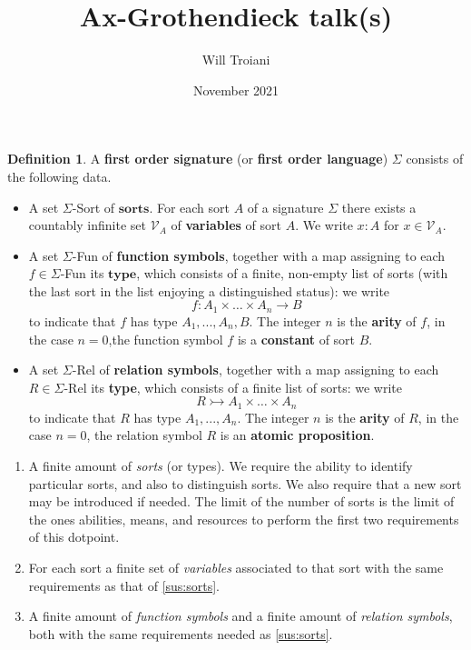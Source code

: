 \documentclass[12pt]{article}
\title{Ax-Grothendieck talk(s)}
\author{Will Troiani}
\date{November 2021}
\theoremstyle{plain}
\theoremstyle{definition}
\newtheorem{defn}[thm]{Definition} %
\newcommand{\call}[1]{\mathcal{#1}}
\newcommand{\lto}{\longrightarrow}
\begin{document}
\maketitle




\begin{defn}\label{def:first_order_language}
	A \textbf{first order signature} (or \textbf{first order language}) $\Sigma$ consists of the following data.
	\begin{itemize}
		\item A set $\Sigma$-Sort of $\textbf{sorts}$. For each sort $A$ of a signature $\Sigma$ there exists a countably infinite set $\call{V}_A$ of \textbf{variables} of sort $A$. We write $x:A$ for $x \in \call{V}_A$. 
		\item A set $\Sigma$-Fun of \textbf{function symbols}, together with a map assigning to each $f \in \Sigma$-Fun its $\textbf{type}$, which consists of a finite, non-empty list of sorts (with the last sort in the list enjoying a distinguished status): we write
		\begin{equation}
			f: A_1 \times \hdots\times A_n \lto B
		\end{equation}
		to indicate that $f$ has type $A_1,...,A_n,B$. The integer $n$ is the \textbf{arity} of $f$, in the case $n = 0$,the function symbol $f$ is a \textbf{constant} of sort $B$.
		\item A set $\Sigma$-Rel of \textbf{relation symbols}, together with a map assigning to each $R \in \Sigma$-Rel its \textbf{type}, which consists of a finite list of sorts: we write
		\begin{equation}
			R \rightarrowtail A_1 \times \hdots \times A_n
		\end{equation}
		to indicate that $R$ has type $A_1,...,A_n$. The integer $n$ is the \textbf{arity} of $R$, in the case $n = 0$, the relation symbol $R$ is an \textbf{atomic proposition}.
	\end{itemize}
\end{defn}

\begin{enumerate}
	\item\label{sus:sorts} A finite amount of \emph{sorts} (or types). We require the ability to identify particular sorts, and also to distinguish sorts. We also require that a new sort may be introduced if needed. The limit of the number of sorts is the limit of the ones abilities, means, and resources to perform the first two requirements of this dotpoint.
	\item For each sort a finite set of \emph{variables} associated to that sort with the same requirements as that of \ref{sus:sorts}.
	\item A finite amount of \emph{function symbols} and a finite amount of \emph{relation symbols}, both with the same requirements needed as \ref{sus:sorts}.
\end{enumerate}
\end{document}
